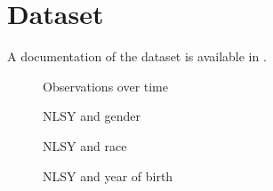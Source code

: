 \FloatBarrier\section{Dataset}
A documentation of the dataset is available in \cite{NLSY.2014}.

\begin{figure}[htp]\centering
\caption{Observations over time}
\end{figure}

\begin{figure}[htp]\centering
\caption{NLSY and gender}
\end{figure}

\begin{figure}[htp]\centering
\caption{NLSY and race}
\end{figure}

\begin{figure}[htp]\centering
\caption{NLSY and year of birth}
\end{figure}
